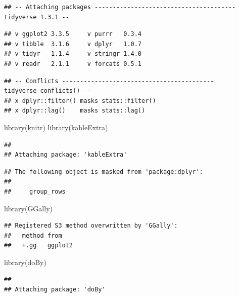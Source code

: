 \documentclass[
]{article}
\newenvironment{Shaded}{\begin{snugshade}}{\end{snugshade}}
\newcommand{\FunctionTok}[1]{\textcolor[rgb]{0.00,0.00,0.00}{#1}}
\newcommand{\NormalTok}[1]{#1}
\begin{document}
\begin{verbatim}
## -- Attaching packages --------------------------------------- tidyverse 1.3.1 --
\end{verbatim}

\begin{verbatim}
## v ggplot2 3.3.5     v purrr   0.3.4
## v tibble  3.1.6     v dplyr   1.0.7
## v tidyr   1.1.4     v stringr 1.4.0
## v readr   2.1.1     v forcats 0.5.1
\end{verbatim}

\begin{verbatim}
## -- Conflicts ------------------------------------------ tidyverse_conflicts() --
## x dplyr::filter() masks stats::filter()
## x dplyr::lag()    masks stats::lag()
\end{verbatim}

\begin{Shaded}
\begin{Highlighting}[]
\FunctionTok{library}\NormalTok{(knitr)}
\FunctionTok{library}\NormalTok{(kableExtra)}
\end{Highlighting}
\end{Shaded}

\begin{verbatim}
## 
## Attaching package: 'kableExtra'
\end{verbatim}

\begin{verbatim}
## The following object is masked from 'package:dplyr':
## 
##     group_rows
\end{verbatim}

\begin{Shaded}
\begin{Highlighting}[]
\FunctionTok{library}\NormalTok{(GGally)}
\end{Highlighting}
\end{Shaded}

\begin{verbatim}
## Registered S3 method overwritten by 'GGally':
##   method from   
##   +.gg   ggplot2
\end{verbatim}

\begin{Shaded}
\begin{Highlighting}[]
\FunctionTok{library}\NormalTok{(doBy)}
\end{Highlighting}
\end{Shaded}

\begin{verbatim}
## 
## Attaching package: 'doBy'
\end{verbatim}
\end{document}
